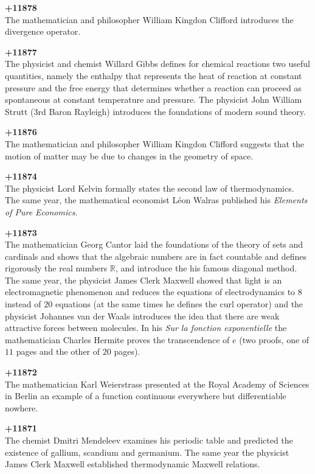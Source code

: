 \textbf{+11878}\\
The mathematician and philosopher William Kingdon Clifford introduces the divergence operator.

\textbf{+11877}\\
The physicist and chemist Willard Gibbs defines for chemical reactions two useful quantities, namely the enthalpy that represents the heat of reaction at constant pressure and the free energy that determines whether a reaction can proceed as spontaneous at constant temperature and pressure. The physicist John William Strutt (3rd Baron Rayleigh) introduces the foundations of modern sound theory. 

\textbf{+11876}\\
The mathematician and philosopher William Kingdon Clifford suggests that the motion of matter may be due to changes in the geometry of space.

\textbf{+11874}\\
The physicist Lord Kelvin formally states the second law of thermodynamics. The same year, the mathematical economist Léon Walras published his \textit{Elements of Pure Economics}.

\textbf{+11873}\\
The mathematician Georg Cantor laid the foundations of the theory of sets and cardinals and shows that the algebraic numbers are in fact countable and defines rigorously the real numbers $\mathbb{R}$, and introduce the his famous diagonal method. The same year, the physicist James Clerk Maxwell showed that light is an electromagnetic phenomenon and reduces the equations of electrodynamics to $8$ instead of $20$ equations (at the same times he defines the curl operator) and the physicist Johannes van der Waals introduces the idea that there are weak attractive forces between molecules. In his \textit{Sur la fonction exponentielle} the mathematician Charles Hermite proves the transcendence of $e$ (two proofs, one of $11$ pages and the other of $20$ pages).

\textbf{+11872}\\
The mathematician Karl Weierstrass presented at the Royal Academy of Sciences in Berlin an example of a function continuous everywhere but differentiable nowhere.

\textbf{+11871}\\
The chemist Dmitri Mendeleev examines his periodic table and predicted the existence of gallium, scandium and germanium. The same year the physicist James Clerk Maxwell established thermodynamic Maxwell relations. 

